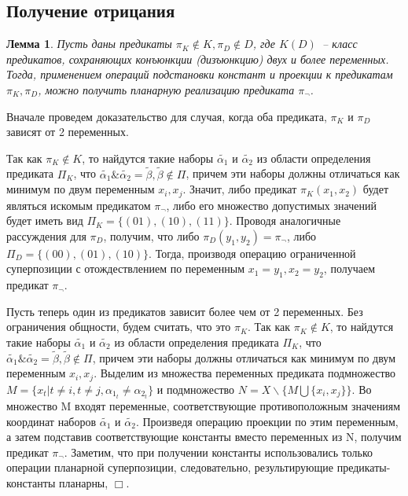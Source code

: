 \documentclass[12pt]{extarticle}
\newtheorem{lemma}[theorem]{Лемма}
\newenvironment{proof}[1][Доказательство.]{\begin{trivlist}
\item[\hskip \labelsep {\bfseries #1}]}{\end{trivlist}}
\begin{document}
\subsection{Получение отрицания}
\begin{lemma}
\label{eq:negate}
Пусть даны предикаты $\pi_K \notin K, \pi_D \notin D$, где $K (D)$~-- класс предикатов, 
сохраняющих конъюнкции (дизъюнкцию) двух и более переменных.
Тогда, применением операций подстановки констант и проекции
к предикатам $\pi_K, \pi_D$, можно получить планарную реализацию предиката $\pi_{\neg}$.
\end{lemma}

\begin{proof}
Вначале проведем доказательство для случая, когда оба предиката, $\pi_K$ и $\pi_D$ зависят от 2 переменных.

Так как $\pi_K \notin K$, то найдутся такие наборы $\widetilde{\alpha_1}$ и 
$\widetilde{\alpha_2}$ из области определения предиката $\Pi_K$, что
$\widetilde{\alpha_1}\&\widetilde{\alpha_2}=\widetilde{\beta}, \widetilde{\beta} \notin \Pi$, причем эти наборы должны отличаться как минимум по двум переменным $x_i, x_{j}$.
Значит, либо предикат $\pi_K(x_1, x_2)$ будет являться искомым предикатом $\pi_{\neg}$, либо его множество
допустимых значений будет иметь вид $\Pi_K = \{ (01), (10), (11) \}$. 
Проводя аналогичные рассуждения для $\pi_D$, получим, что либо $\pi_D(y_1, y_2) = \pi_{\neg}$, либо $\Pi_D = \{ (00), (01), (10) \}$.
Тогда, производя операцию ограниченной суперпозиции с отождествлением по переменным $x_1=y_1, x_2=y_2$, получаем
предикат $\pi_{\neg}$.

Пусть теперь один из предикатов зависит более чем от 2 переменных. Без ограничения общности, будем считать, что это $\pi_K$.
Так как $\pi_K \notin K$, то найдутся такие наборы $\widetilde{\alpha_1}$ и $\widetilde{\alpha_2}$ из области определения предиката $\Pi_K$, что
$\widetilde{\alpha_1}\&\widetilde{\alpha_2}=\widetilde{\beta}, \widetilde{\beta} \notin \Pi$, причем эти наборы должны отличаться как минимум по двум переменным $x_i, x_{j}$.
Выделим из множества переменных предиката подмножество $M = \{ x_t | t \neq i, t \neq j, \alpha_{1_t} \neq \alpha_{2_t} \}$ и 
подмножество $N = X \backslash \{ M \bigcup \{x_i, x_j\} \}$.
Во множество M входят переменные, соответствующие противоположным значениям координат наборов $\widetilde{\alpha_1}$ и 
$\widetilde{\alpha_2}$.
Произведя операцию проекции по этим переменным, а затем подставив соответствующие
константы вместо переменных из N, получим предикат $\pi_{\neg}$.
Заметим, что при получении константы использовались только операции планарной суперпозиции, следовательно, 
результирующие предикаты-константы планарны, $\Box$.
\end{proof}
\end{document}
